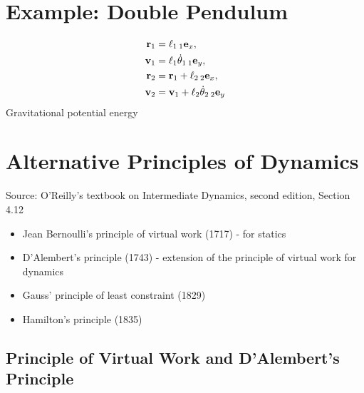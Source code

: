 \documentclass[
  letterpaper,
  DIV=11,
  numbers=noendperiod]{scrreprt}
\providecommand{\tightlist}{%
  \setlength{\itemsep}{0pt}\setlength{\parskip}{0pt}}
\begin{document}
\section{Example: Double Pendulum}\label{example-double-pendulum}

\begin{align}
    \begin{split}
        {\bf r}_1 &= \ell_1\,{}_{1}{\bf e}_x,\\
        {\bf v}_1 &= \ell_1\dot{\theta}_1\,{}_{1}{\bf e}_y,\\
        {\bf r}_2 &= {\bf r}_1+\ell_2\,{}_{2}{\bf e}_x,\\
        {\bf v}_2 &= {\bf v}_1+\ell_2\dot{\theta}_2\,{}_{2}{\bf e}_y
    \end{split}
\end{align} Gravitational potential energy

\section{Alternative Principles of
Dynamics}\label{alternative-principles-of-dynamics}

Source: O'Reilly's textbook on Intermediate Dynamics, second edition,
Section 4.12

\begin{itemize}
\tightlist
\item
  Jean Bernoulli's principle of virtual work (1717) - for statics
\item
  D'Alembert's principle (1743) - extension of the principle of virtual
  work for dynamics
\item
  Gauss' principle of least constraint (1829)
\item
  Hamilton's principle (1835)
\end{itemize}

\subsection{Principle of Virtual Work and D'Alembert's
Principle}\label{principle-of-virtual-work-and-dalemberts-principle}
\end{document}
